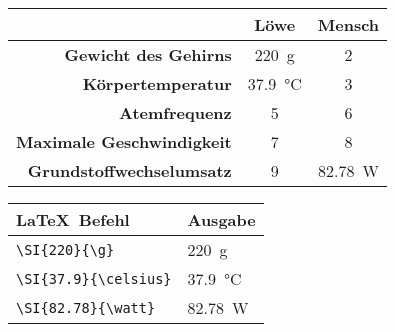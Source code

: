 \begin{frame}[fragile]
\Losung
	\begin{outputbox}
		\begin{center}
			\begin{tabular}{r|cc}
				\hline
				&	\textbf{Löwe}										& \textbf{Mensch} 						\\ \hline
				\textbf{Gewicht des Gehirns}		&	\SI{220}{\g}										& 2			\\ 
				\textbf{Körpertemperatur}			&	\SI{37.9}{\celsius}							& 3	\\
				\textbf{Atemfrequenz}				&	5								& 6 					\\
				\textbf{Maximale Geschwindigkeit}	&	7								& 8				\\ 
				\textbf{Grundstoffwechselumsatz}	& 9	&  \SI{82.78}{\watt}\\
				\hline
			\end{tabular}
		\end{center}
	\end{outputbox}
			\begin{center}
			\begin{tabular}{ll}
				\toprule
				\LaTeX\ Befehl						&	Ausgabe						\\ \midrule
				\lstinline|\SI{220}{\g}|			&	\SI{220}{\g}					\\
				\lstinline|\SI{37.9}{\celsius}|		&	\SI{37.9}{\celsius}			\\
				\lstinline|\SI{82.78}{\watt}|		&	\SI{82.78}{\watt}			\\
				\bottomrule
			\end{tabular}
		\end{center}
	
	
	
\end{frame}
